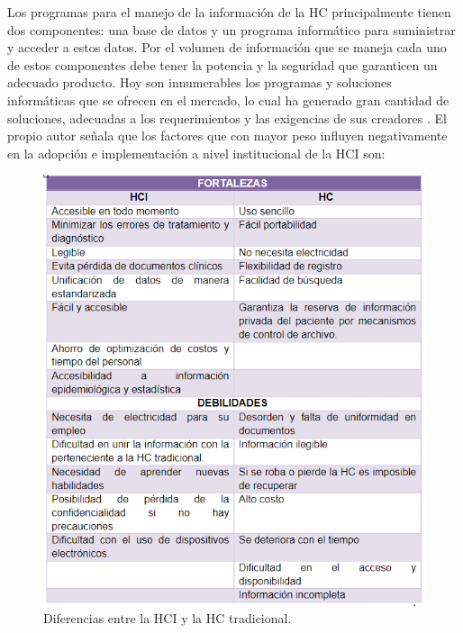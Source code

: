 Los programas para el manejo de la información de la HC principalmente tienen dos componentes: una base de datos y un programa informático para suministrar y acceder a estos datos. Por el volumen de información que se maneja cada uno de estos componentes debe tener la potencia y la seguridad que garanticen un adecuado producto. Hoy son innumerables los programas y soluciones informáticas que se ofrecen en el mercado, lo cual ha generado gran cantidad de soluciones, adecuadas a los requerimientos y las exigencias de sus creadores . El propio autor señala que los factores que con mayor peso influyen negativamente en la adopción e implementación a nivel institucional de la HCI son:  
\begin{center}
	\begin{figure}
		\caption{Diferencias entre la HCI y la HC tradicional. }
		\label{HCIvsHC}
		\includegraphics[]{MainMatter/HCIvsHC.PNG}
	\end{figure}
\end{center}


